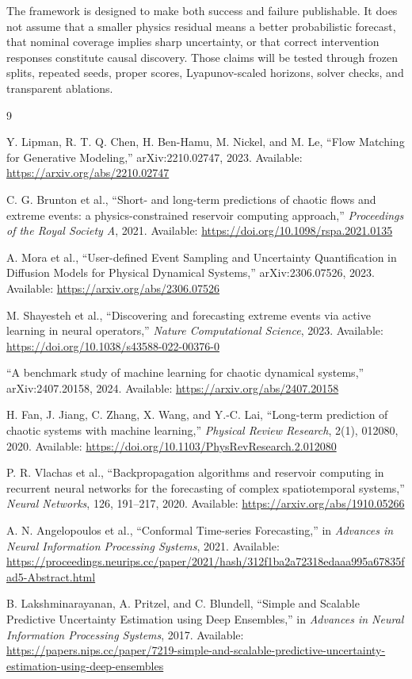 \documentclass[11pt]{article}
\begin{document}
The framework is designed to make both success and failure publishable. It does not assume that a smaller physics residual means a better probabilistic forecast, that nominal coverage implies sharp uncertainty, or that correct intervention responses constitute causal discovery. Those claims will be tested through frozen splits, repeated seeds, proper scores, Lyapunov-scaled horizons, solver checks, and transparent ablations.

\begin{thebibliography}{9}

Y. Lipman, R. T. Q. Chen, H. Ben-Hamu, M. Nickel, and M. Le, ``Flow Matching for Generative Modeling,'' arXiv:2210.02747, 2023. Available: \url{https://arxiv.org/abs/2210.02747}

C. G. Brunton et al., ``Short- and long-term predictions of chaotic flows and extreme events: a physics-constrained reservoir computing approach,'' \emph{Proceedings of the Royal Society A}, 2021. Available: \url{https://doi.org/10.1098/rspa.2021.0135}

A. Mora et al., ``User-defined Event Sampling and Uncertainty Quantification in Diffusion Models for Physical Dynamical Systems,'' arXiv:2306.07526, 2023. Available: \url{https://arxiv.org/abs/2306.07526}

M. Shayesteh et al., ``Discovering and forecasting extreme events via active learning in neural operators,'' \emph{Nature Computational Science}, 2023. Available: \url{https://doi.org/10.1038/s43588-022-00376-0}

``A benchmark study of machine learning for chaotic dynamical systems,'' arXiv:2407.20158, 2024. Available: \url{https://arxiv.org/abs/2407.20158}

H. Fan, J. Jiang, C. Zhang, X. Wang, and Y.-C. Lai, ``Long-term prediction of chaotic systems with machine learning,'' \emph{Physical Review Research}, 2(1), 012080, 2020. Available: \url{https://doi.org/10.1103/PhysRevResearch.2.012080}

P. R. Vlachas et al., ``Backpropagation algorithms and reservoir computing in recurrent neural networks for the forecasting of complex spatiotemporal systems,'' \emph{Neural Networks}, 126, 191--217, 2020. Available: \url{https://arxiv.org/abs/1910.05266}

A. N. Angelopoulos et al., ``Conformal Time-series Forecasting,'' in \emph{Advances in Neural Information Processing Systems}, 2021. Available: \url{https://proceedings.neurips.cc/paper/2021/hash/312f1ba2a72318edaaa995a67835fad5-Abstract.html}

B. Lakshminarayanan, A. Pritzel, and C. Blundell, ``Simple and Scalable Predictive Uncertainty Estimation using Deep Ensembles,'' in \emph{Advances in Neural Information Processing Systems}, 2017. Available: \url{https://papers.nips.cc/paper/7219-simple-and-scalable-predictive-uncertainty-estimation-using-deep-ensembles}

\end{thebibliography}
\end{document}
